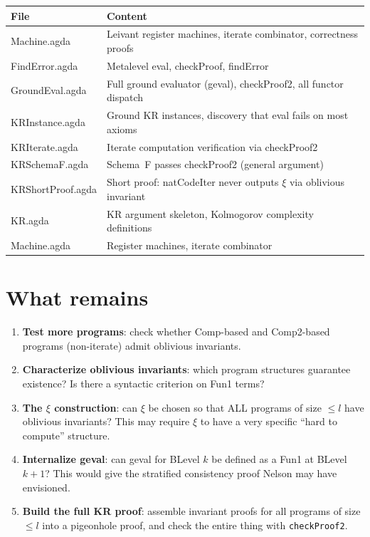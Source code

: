 \documentclass[11pt]{article}
\begin{document}
\begin{center}
\begin{tabular}{lp{8cm}}
\toprule
\textbf{File} & \textbf{Content} \\
\midrule
Machine.agda & Leivant register machines, iterate combinator, correctness proofs \\
FindError.agda & Metalevel eval, checkProof, findError \\
GroundEval.agda & Full ground evaluator (geval), checkProof2, all functor dispatch \\
KRInstance.agda & Ground KR instances, discovery that eval fails on most axioms \\
KRIterate.agda & Iterate computation verification via checkProof2 \\
KRSchemaF.agda & Schema~F passes checkProof2 (general argument) \\
KRShortProof.agda & Short proof: natCodeIter never outputs $\xi$ via oblivious invariant \\
KR.agda & KR argument skeleton, Kolmogorov complexity definitions \\
Machine.agda & Register machines, iterate combinator \\
\bottomrule
\end{tabular}
\end{center}

\section{What remains}

\begin{enumerate}
\item \textbf{Test more programs}: check whether Comp-based and Comp2-based programs (non-iterate) admit oblivious invariants.

\item \textbf{Characterize oblivious invariants}: which program structures guarantee existence? Is there a syntactic criterion on Fun1 terms?

\item \textbf{The $\xi$ construction}: can $\xi$ be chosen so that ALL programs of size $\le l$ have oblivious invariants? This may require $\xi$ to have a very specific ``hard to compute'' structure.

\item \textbf{Internalize geval}: can geval for BLevel $k$ be defined as a Fun1 at BLevel $k+1$? This would give the stratified consistency proof Nelson may have envisioned.

\item \textbf{Build the full KR proof}: assemble invariant proofs for all programs of size $\le l$ into a pigeonhole proof, and check the entire thing with \texttt{checkProof2}.
\end{enumerate}
\end{document}
